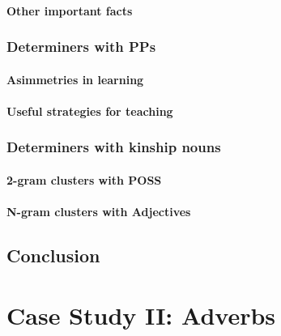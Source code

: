 \documentclass[
  a4paper,
  twoside,
  12pt,
  chapterprefix=false,
  bibliography=totocnumbered,
  listof=flat]{scrbook}
\begin{document}
\hypertarget{other-important-facts}{%
\subsubsection{Other important facts}\label{other-important-facts}}

\hypertarget{determiners-with-pps}{%
\subsection{Determiners with PPs}\label{determiners-with-pps}}

\hypertarget{asimmetries-in-learning}{%
\subsubsection{Asimmetries in learning}\label{asimmetries-in-learning}}

\hypertarget{useful-strategies-for-teaching}{%
\subsubsection{Useful strategies for teaching}\label{useful-strategies-for-teaching}}

\hypertarget{determiners-with-kinship-nouns}{%
\subsection{Determiners with kinship nouns}\label{determiners-with-kinship-nouns}}

\hypertarget{gram-clusters-with-poss}{%
\subsubsection{2-gram clusters with POSS}\label{gram-clusters-with-poss}}

\hypertarget{n-gram-clusters-with-adjectives}{%
\subsubsection{N-gram clusters with Adjectives}\label{n-gram-clusters-with-adjectives}}

\hypertarget{conclusion}{%
\section{Conclusion}\label{conclusion}}

\hypertarget{case-study-ii-adverbs}{%
\chapter{Case Study II: Adverbs}\label{case-study-ii-adverbs}}
\end{document}
